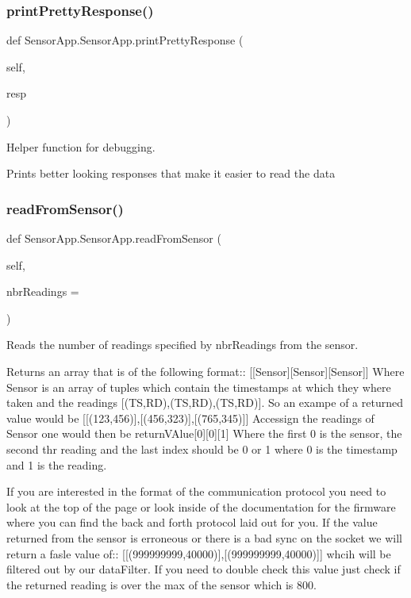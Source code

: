 \subsubsection{\texorpdfstring{print\+Pretty\+Response()}{printPrettyResponse()}}
{\footnotesize\ttfamily def Sensor\+App.\+Sensor\+App.\+print\+Pretty\+Response (\begin{DoxyParamCaption}\item[{}]{self,  }\item[{}]{resp }\end{DoxyParamCaption})}



Helper function for debugging. 

Prints better looking responses that make it easier to read the data \mbox{\label{class_sensor_app_1_1_sensor_app_aae2bb034ebfed964fa17fef43dddc8da}} 
\subsubsection{\texorpdfstring{read\+From\+Sensor()}{readFromSensor()}}
{\footnotesize\ttfamily def Sensor\+App.\+Sensor\+App.\+read\+From\+Sensor (\begin{DoxyParamCaption}\item[{}]{self,  }\item[{}]{nbr\+Readings = {} }\end{DoxyParamCaption})}



Reads the number of readings specified by nbr\+Readings from the sensor. 

Returns an array that is of the following format\+:\+: \mbox{[}\mbox{[}Sensor\mbox{]}\mbox{[}Sensor\mbox{]}\mbox{[}Sensor\mbox{]}\mbox{]} Where Sensor is an array of tuples which contain the timestamps at which they where taken and the readings \mbox{[}(TS,RD),(TS,RD),(TS,RD)\mbox{]}. So an exampe of a returned value would be \mbox{[}\mbox{[}(123,456)\mbox{]},\mbox{[}(456,323)\mbox{]},\mbox{[}(765,345)\mbox{]}\mbox{]} Accessign the readings of Sensor one would then be return\+V\+Alue\mbox{[}0\mbox{]}\mbox{[}0\mbox{]}\mbox{[}1\mbox{]} Where the first 0 is the sensor, the second thr reading and the last index should be 0 or 1 where 0 is the timestamp and 1 is the reading. \begin{DoxyVerb}   If you are interested in the format of the communication protocol you need to look at the top of the page or look inside of the documentation for the firmware where you can find the back and forth protocol laid out for you. If the value returned from the sensor is erroneous or there is a bad sync on the socket we will return a fasle value of:: [[(999999999,40000)],[(999999999,40000)]] whcih will be filtered out by our dataFilter. If you need to double check this value just check if the returned reading is over the max of the sensor which is 800.
\end{DoxyVerb}



